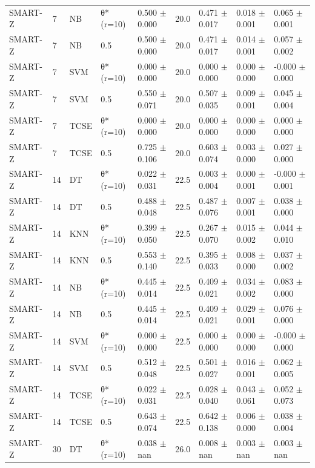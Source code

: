 \begin{table}[t]
\begin{tabular}{lllllllll}
SMART-Z & 7 & NB & θ* (r=10) & 0.500 $\pm$ 0.000 & 20.0 & 0.471 $\pm$ 0.017 & 0.018 $\pm$ 0.001 & 0.065 $\pm$ 0.001 \\
SMART-Z & 7 & NB & 0.5 & 0.500 $\pm$ 0.000 & 20.0 & 0.471 $\pm$ 0.017 & 0.014 $\pm$ 0.001 & 0.057 $\pm$ 0.002 \\
SMART-Z & 7 & SVM & θ* (r=10) & 0.000 $\pm$ 0.000 & 20.0 & 0.000 $\pm$ 0.000 & 0.000 $\pm$ 0.000 & -0.000 $\pm$ 0.000 \\
SMART-Z & 7 & SVM & 0.5 & 0.550 $\pm$ 0.071 & 20.0 & 0.507 $\pm$ 0.035 & 0.009 $\pm$ 0.001 & 0.045 $\pm$ 0.004 \\
SMART-Z & 7 & TCSE & θ* (r=10) & 0.000 $\pm$ 0.000 & 20.0 & 0.000 $\pm$ 0.000 & 0.000 $\pm$ 0.000 & 0.000 $\pm$ 0.000 \\
SMART-Z & 7 & TCSE & 0.5 & 0.725 $\pm$ 0.106 & 20.0 & 0.603 $\pm$ 0.074 & 0.003 $\pm$ 0.000 & 0.027 $\pm$ 0.000 \\
SMART-Z & 14 & DT & θ* (r=10) & 0.022 $\pm$ 0.031 & 22.5 & 0.003 $\pm$ 0.004 & 0.000 $\pm$ 0.001 & -0.000 $\pm$ 0.001 \\
SMART-Z & 14 & DT & 0.5 & 0.488 $\pm$ 0.048 & 22.5 & 0.487 $\pm$ 0.076 & 0.007 $\pm$ 0.001 & 0.038 $\pm$ 0.000 \\
SMART-Z & 14 & KNN & θ* (r=10) & 0.399 $\pm$ 0.050 & 22.5 & 0.267 $\pm$ 0.070 & 0.015 $\pm$ 0.002 & 0.044 $\pm$ 0.010 \\
SMART-Z & 14 & KNN & 0.5 & 0.553 $\pm$ 0.140 & 22.5 & 0.395 $\pm$ 0.033 & 0.008 $\pm$ 0.000 & 0.037 $\pm$ 0.002 \\
SMART-Z & 14 & NB & θ* (r=10) & 0.445 $\pm$ 0.014 & 22.5 & 0.409 $\pm$ 0.021 & 0.034 $\pm$ 0.002 & 0.083 $\pm$ 0.000 \\
SMART-Z & 14 & NB & 0.5 & 0.445 $\pm$ 0.014 & 22.5 & 0.409 $\pm$ 0.021 & 0.029 $\pm$ 0.001 & 0.076 $\pm$ 0.000 \\
SMART-Z & 14 & SVM & θ* (r=10) & 0.000 $\pm$ 0.000 & 22.5 & 0.000 $\pm$ 0.000 & 0.000 $\pm$ 0.000 & -0.000 $\pm$ 0.000 \\
SMART-Z & 14 & SVM & 0.5 & 0.512 $\pm$ 0.048 & 22.5 & 0.501 $\pm$ 0.027 & 0.016 $\pm$ 0.001 & 0.062 $\pm$ 0.005 \\
SMART-Z & 14 & TCSE & θ* (r=10) & 0.022 $\pm$ 0.031 & 22.5 & 0.028 $\pm$ 0.040 & 0.043 $\pm$ 0.061 & 0.052 $\pm$ 0.073 \\
SMART-Z & 14 & TCSE & 0.5 & 0.643 $\pm$ 0.074 & 22.5 & 0.642 $\pm$ 0.138 & 0.006 $\pm$ 0.000 & 0.038 $\pm$ 0.004 \\
SMART-Z & 30 & DT & θ* (r=10) & 0.038 $\pm$ nan & 26.0 & 0.008 $\pm$ nan & 0.003 $\pm$ nan & 0.003 $\pm$ nan \\

\end{tabular}
\end{table}
